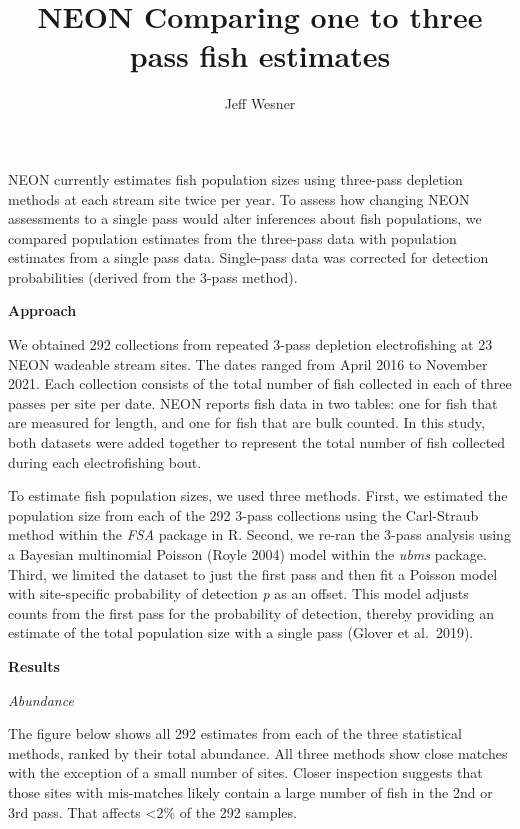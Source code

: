 \documentclass[
  letterpaper,
  DIV=11,
  numbers=noendperiod]{scrartcl}
\title{NEON Comparing one to three pass fish estimates}
\author{Jeff Wesner}
\date{}
\begin{document}
\maketitle
\ifdefined\Shaded\renewenvironment{Shaded}{\begin{tcolorbox}[breakable, interior hidden, borderline west={3pt}{0pt}{shadecolor}, boxrule=0pt, frame hidden, enhanced, sharp corners]}{\end{tcolorbox}}\fi

NEON currently estimates fish population sizes using three-pass
depletion methods at each stream site twice per year. To assess how
changing NEON assessments to a single pass would alter inferences about
fish populations, we compared population estimates from the three-pass
data with population estimates from a single pass data. Single-pass data
was corrected for detection probabilities (derived from the 3-pass
method).

\textbf{Approach}

We obtained 292 collections from repeated 3-pass depletion
electrofishing at 23 NEON wadeable stream sites. The dates ranged from
April 2016 to November 2021. Each collection consists of the total
number of fish collected in each of three passes per site per date. NEON
reports fish data in two tables: one for fish that are measured for
length, and one for fish that are bulk counted. In this study, both
datasets were added together to represent the total number of fish
collected during each electrofishing bout.

To estimate fish population sizes, we used three methods. First, we
estimated the population size from each of the 292 3-pass collections
using the Carl-Straub method within the \emph{FSA} package in R. Second,
we re-ran the 3-pass analysis using a Bayesian multinomial Poisson
(Royle 2004) model within the \emph{ubms} package. Third, we limited the
dataset to just the first pass and then fit a Poisson model with
site-specific probability of detection \emph{p} as an offset. This model
adjusts counts from the first pass for the probability of detection,
thereby providing an estimate of the total population size with a single
pass (Glover et al.~2019).

\textbf{Results}

\emph{Abundance}

The figure below shows all 292 estimates from each of the three
statistical methods, ranked by their total abundance. All three methods
show close matches with the exception of a small number of sites. Closer
inspection suggests that those sites with mis-matches likely contain a
large number of fish in the 2nd or 3rd pass. That affects \textless2\%
of the 292 samples.
\end{document}
